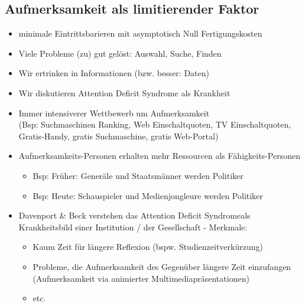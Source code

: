 \documentclass{article} %
\begin{document}
	\subsection{Aufmerksamkeit als limitierender Faktor}		
	\begin{itemize}
		\item minimale Eintrittsbarieren mit asymptotisch Null Fertigungskosten
		\item Viele Probleme (zu) gut gelöst: Auswahl, Suche, Finden
		\item Wir ertrinken in Informationen (bzw. besser: Daten)
		\item Wir diskutieren Attention Deficit Syndrome als Krankheit
		\item Immer intensiverer Wettbewerb um Aufmerksamkeit\\
		(Bsp: Suchmaschinen Ranking, Web Einschaltquoten, TV Einschaltquoten, Gratis-Handy, gratis Suchmaschine, gratis Web-Portal)
		\item Aufmerksamkeits-Personen erhalten mehr Ressourcen als Fähigkeits-Personen
		\begin{itemize}
			\item Bsp: Früher: Generäle und Staatsmänner werden Politiker
			\item Bsp: Heute: Schauspieler und Medienjongleure werden Politiker
		\end{itemize}
		\item Davenport \& Beck verstehen das \glqq Attention Deficit Syndrome\grqq als Krankheitsbild einer Institution / der Gesellschaft - Merkmale:
		\begin{itemize}
			\item Kaum Zeit für längere Reflexion (bspw. Studienzeitverkürzung)
			\item Probleme, die Aufmerksamkeit des Gegenüber längere Zeit einzufangen (Aufmerksamkeit via animierter Multimediapräsentationen)
			\item etc.
		\end{itemize}
	\end{itemize}		
\end{document}
